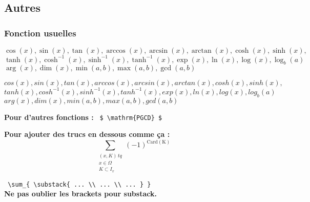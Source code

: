 \documentclass{report}
\begin{document}
\subsection*{Autres}

\subsubsection*{Fonction usuelles}

\begin{center}

$ \cos(x), \sin(x), \tan(x), \arccos(x), \arcsin(x), \arctan(x), \cosh(x), \sinh(x), $ \\ 
$ \tanh(x), \cosh^{-1}(x), \sinh^{-1}(x), \tanh^{-1}(x),  \exp(x), \ln(x), \log(x), \log_{b}(a) $ \\
$ \arg(x), \dim(x), \min(a,b), \max(a,b), \gcd(a,b) $ \\

\bigskip

$ cos(x), sin(x), tan(x), arccos(x), arcsin(x), arctan(x), cosh(x), sinh(x), $ \\
$ tanh(x), cosh^{-1}(x), sinh^{-1}(x), tanh^{-1}(x),  exp(x), ln(x), log(x), log_{b}(a) $ \\
$ arg(x), dim(x), min(a,b), max(a,b), gcd(a,b) $ \\

\end{center}

\textbf{Pour d'autres fonctions : }
\texttt{ \$ \textbackslash{}mathrm\{PGCD\} \$}

\textbf{Pour ajouter des trucs en dessous comme ça :}
$$ \sum_{\substack{(x,K) \, tq \\ x \in \Omega \\ K \subset I_{x}}} (-1)^{\mathrm{Card(K)}} $$ 
\begin{center}  \texttt{ \textbackslash{}sum\_\{ \textbackslash{}substack\{ ... \textbackslash{}\textbackslash{}
... \textbackslash{}\textbackslash{} ... \} \}} \\
\textbf{Ne pas oublier les brackets pour substack.}\end{center}

\newpage
\end{document}
